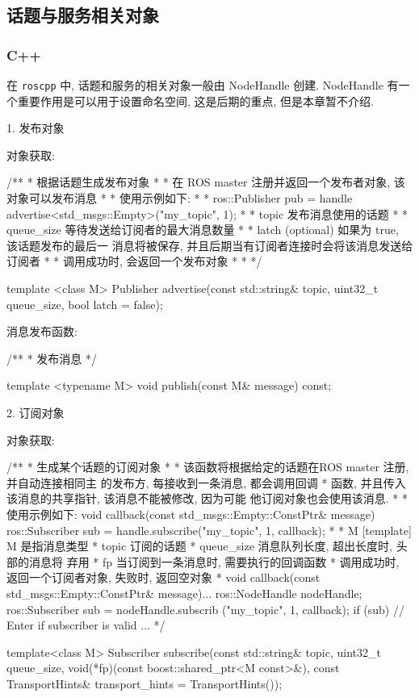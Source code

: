 \documentclass[openany, fontset=windowsold]{ctexbook}
\theoremstyle{kaiti}
\theoremstyle{normal}
\begin{document}
\subsection{话题与服务相关对象}

\subsubsection{C++}

在 \verb|roscpp| 中, 话题和服务的相关对象一般由 NodeHandle 创建. NodeHandle 有一个重要作用是可以用于设置命名空间, 这是后期的重点, 但是本章暂不介绍.

1. 发布对象

对象获取:

\begin{cpp}
  /**
   * \brief 根据话题生成发布对象
   *
   * 在 ROS master 注册并返回一个发布者对象, 该对象可以发布消息
   *
   * 使用示例如下:
   *
   *   ros::Publisher pub = handle advertise<std_msgs::Empty>("my_topic", 1);
   *
   * \param topic 发布消息使用的话题
   *
   * \param queue_size 等待发送给订阅者的最大消息数量
   *
   * \param latch (optional) 如果为 true, 该话题发布的最后一 消息将被保存, 并且后期当有订阅者连接时会将该消息发送给订阅者
   *
   * \return 调用成功时, 会返回一个发布对象
   *
   *
   */

  template <class M>
  Publisher advertise(const std::string& topic, uint32_t queue_size, bool latch = false);
\end{cpp}

消息发布函数:

\begin{cpp}
  /**
   * 发布消息          
   */

  template <typename M>
  void publish(const M& message) const;
\end{cpp}

2. 订阅对象

对象获取:

\begin{cpp}
  /**
   * \brief 生成某个话题的订阅对象
   *
   * 该函数将根据给定的话题在ROS master 注册, 并自动连接相同主 的发布方, 每接收到一条消息, 都会调用回调
   * 函数, 并且传入该消息的共享指针, 该消息不能被修改, 因为可能 他订阅对象也会使用该消息.
   * 
   * 使用示例如下:
   \verbatim
   void callback(const std_msgs::Empty::ConstPtr& message)
   {
   } 
   ros::Subscriber sub = handle.subscribe("my_topic", 1, callback);
   \endverbatim
   *
   * \param M [template] M 是指消息类型
   * \param topic 订阅的话题
   * \param queue_size 消息队列长度, 超出长度时, 头部的消息将 弃用
   * \param fp 当订阅到一条消息时, 需要执行的回调函数
   * \return 调用成功时, 返回一个订阅者对象, 失败时, 返回空对象
   * 
   \verbatim
   void callback(const std_msgs::Empty::ConstPtr& message){...}
   ros::NodeHandle nodeHandle;
   ros::Subscriber sub = nodeHandle.subscrib ("my_topic", 1, callback);
   if (sub) // Enter if subscriber is valid
   {
   ...
   }
   \endverbatim
   */

  template<class M>
  Subscriber subscribe(const std::string& topic, uint32_t queue_size, void(*fp)(const boost::shared_ptr<M const>&), const TransportHints& transport_hints = TransportHints());
\end{cpp}
\end{document}
